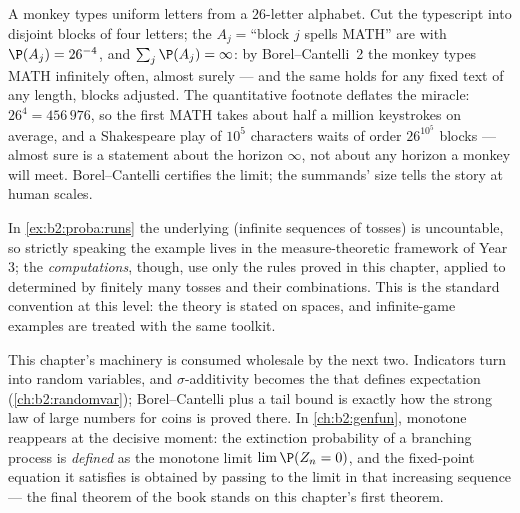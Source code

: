 \begin{example}
A monkey types  uniform letters from a
$26$-letter alphabet. Cut the typescript into disjoint blocks
of four letters; the  $A_j = {}$``block $j$ spells
MATH'' are  with $\P(A_j) = 26^{-4}$, and
$\sum_j\P(A_j) = \infty$: by Borel--Cantelli~2 the monkey
types MATH infinitely often, almost surely --- and the same
holds for any fixed text of any length, blocks adjusted.
The quantitative footnote deflates the miracle: $26^4 =
456\,976$, so the first MATH takes about half a million
keystrokes on average, and a Shakespeare play of $10^5$
characters waits of order $26^{10^5}$ blocks --- almost sure
is a statement about the horizon $\infty$, not about any
horizon a monkey will meet. Borel--Cantelli certifies the
limit; the summands' size tells the story at human scales.
\end{example}

\begin{remark}
In \cref{ex:b2:proba:runs} the underlying  (infinite
sequences of tosses) is uncountable, so strictly speaking the
example lives in the measure-theoretic framework of Year 3; the
\emph{computations}, though, use only the rules proved in this
chapter, applied to  determined by finitely many tosses and
their  combinations. This is the standard convention at this level:
the theory is stated on  spaces, and infinite-game
examples are treated with the same toolkit.
\end{remark}

\begin{remark}
This chapter's machinery is consumed wholesale by the next
two. Indicators turn  into random variables, and
$\sigma$-additivity becomes the  that defines
expectation (\cref{ch:b2:randomvar}); Borel--Cantelli plus a
 tail bound is exactly how the strong law of large
numbers for coins is proved there. In
\cref{ch:b2:genfun}, monotone  reappears at the
decisive moment: the extinction probability of a branching
process is \emph{defined} as the monotone limit
$\lim\P(Z_n = 0)$, and the fixed-point equation it satisfies
is obtained by passing to the limit in that increasing
sequence --- the final theorem of the book stands on this
chapter's first theorem.
\end{remark}

